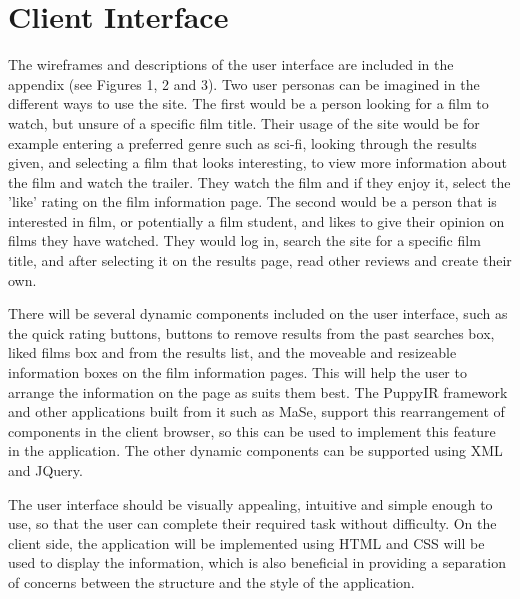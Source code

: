 \documentclass{sig-alt-release2}
\begin{document}
\section{Client Interface} %
The wireframes and descriptions of the user interface are included in the appendix (see Figures 1, 2 and 3). Two user personas can be imagined in the different ways to use the site. The first would be a person looking for a film to watch, but unsure of a specific film title. Their usage of the site would be for example entering a preferred genre such as sci-fi, looking through the results given, and selecting a film that looks interesting, to view more information about the film and watch the trailer. They watch the film and if they enjoy it, select the 'like' rating on the film information page. The second would be a person that is interested in film, or potentially a film student,  and likes to give their opinion on films they have watched. They would log in, search the site for a specific film title, and after selecting it on the results page, read other reviews and create their own. 
 
There will be several dynamic components included on the user interface, such as the quick rating buttons, buttons to remove results from the past searches box, liked films box and from the results list, and the moveable and resizeable information boxes on the film information pages. This will help the user to arrange the information on the page as suits them best. The PuppyIR framework and other applications built from it such as MaSe, support this rearrangement of components in the client browser, so this can be used to implement this feature in the application. The other dynamic components can be supported using XML and JQuery. 
 
The user interface should be visually appealing, intuitive and simple enough to use, so that the user can complete their required task without difficulty. On the client side, the application will be implemented using HTML and CSS will be used to display the information, which is also beneficial in providing a separation of concerns between the structure and the style of the application.
\end{document}
